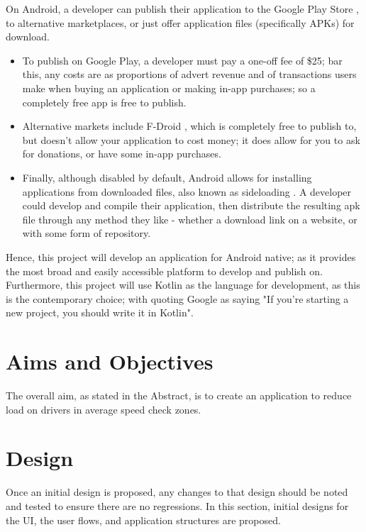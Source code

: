\documentclass[11pt, a4paper, notitlepage]{report}
\begin{document}
On Android, a developer can publish their application to the Google Play Store \citep{googlePlay}, to alternative marketplaces, or just offer application files (specifically APKs) for download.
\begin{itemize}
	\item To publish on Google Play, a developer must pay a one-off fee of \$25; bar this, any costs are as proportions of advert revenue and of transactions users make when buying an application or making in-app purchases; so a completely free app is free to publish.
	\item Alternative markets include F-Droid \citep{FDroid}, which is completely free to publish to, but doesn't allow your application to cost money; it does allow for you to ask for donations, or have some in-app purchases.
	\item Finally, although disabled by default, Android allows for installing applications from downloaded files, also known as sideloading \citep{sideloading}. A developer could develop and compile their application, then distribute the resulting apk file through any method they like - whether a download link on a website, or with some form of repository.
\end{itemize}

Hence, this project will develop an application for Android native; as it provides the most broad and easily accessible platform to develop and publish on. Furthermore, this project will use Kotlin as the language for development, as this is the contemporary choice; with \citet{KotlinFirst} quoting Google as saying "If you’re starting a new project, you should write it in Kotlin".

\chapter{Aims and Objectives}
The overall aim, as stated in the Abstract, is to create an application to reduce load on drivers in average speed check zones.

\chapter{Design}
Once an initial design is proposed, any changes to that design should be noted and tested to ensure there are no regressions. In this section, initial designs for the UI, the user flows, and application structures are proposed.
\end{document}
